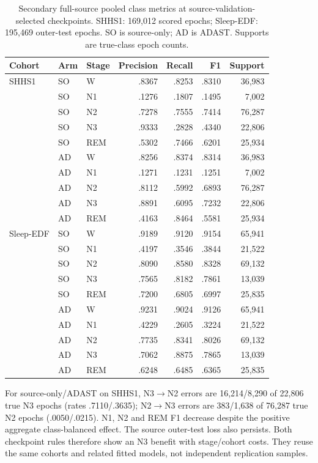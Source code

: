 \documentclass[10pt,a4paper]{article}
\begin{document}
\begin{table}[H]
\centering\small
\renewcommand{\arraystretch}{1.0}
\caption{Secondary full-source pooled class metrics at source-validation-selected
checkpoints. SHHS1: 169,012 scored epochs; Sleep-EDF: 195,469 outer-test epochs.
SO is source-only; AD is ADAST. Supports are true-class epoch counts.}
\label{tab:sup_adast_fullsource_best_classes}
\begin{tabular}{lllrrrr}
\toprule
Cohort & Arm & Stage & Precision & Recall & F1 & Support \\
\midrule
SHHS1 & SO & W & .8367 & .8253 & .8310 & 36,983 \\
 & SO & N1 & .1276 & .1807 & .1495 & 7,002 \\
 & SO & N2 & .7278 & .7555 & .7414 & 76,287 \\
 & SO & N3 & .9333 & .2828 & .4340 & 22,806 \\
 & SO & REM & .5302 & .7466 & .6201 & 25,934 \\
 & AD & W & .8256 & .8374 & .8314 & 36,983 \\
 & AD & N1 & .1271 & .1231 & .1251 & 7,002 \\
 & AD & N2 & .8112 & .5992 & .6893 & 76,287 \\
 & AD & N3 & .8891 & .6095 & .7232 & 22,806 \\
 & AD & REM & .4163 & .8464 & .5581 & 25,934 \\
\midrule
Sleep-EDF & SO & W & .9189 & .9120 & .9154 & 65,941 \\
 & SO & N1 & .4197 & .3546 & .3844 & 21,522 \\
 & SO & N2 & .8090 & .8580 & .8328 & 69,132 \\
 & SO & N3 & .7565 & .8182 & .7861 & 13,039 \\
 & SO & REM & .7200 & .6805 & .6997 & 25,835 \\
 & AD & W & .9231 & .9024 & .9126 & 65,941 \\
 & AD & N1 & .4229 & .2605 & .3224 & 21,522 \\
 & AD & N2 & .7735 & .8341 & .8026 & 69,132 \\
 & AD & N3 & .7062 & .8875 & .7865 & 13,039 \\
 & AD & REM & .6248 & .6485 & .6365 & 25,835 \\
\bottomrule
\end{tabular}
\end{table}

For source-only/ADAST on SHHS1, N3$\rightarrow$N2 errors are 16,214/8,290 of
22,806 true N3 epochs (rates .7110/.3635); N2$\rightarrow$N3 errors are 383/1,638
of 76,287 true N2 epochs (.0050/.0215). N1, N2 and REM F1 decrease despite the
positive aggregate class-balanced effect. The source outer-test loss also persists.
Both checkpoint rules therefore show an N3 benefit with stage/cohort costs. They
reuse the same cohorts and related fitted models, not independent replication samples.
\end{document}
